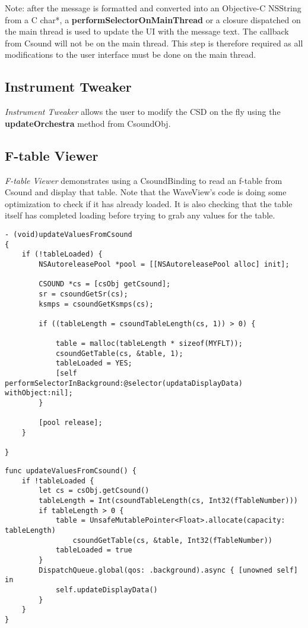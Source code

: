 \documentclass[11pt]{article}
\begin{document}
Note: after the message is formatted and converted into an Objective-C NSString from a C char*, a \textbf{performSelectorOnMainThread} or a closure dispatched on the main thread is used to update the UI with the message text.  The callback from Csound will not be on the main thread. This step is therefore required as all modifications to the user interface must be done on the main thread.

\subsection{Instrument Tweaker}

\emph{Instrument Tweaker} allows the user to modify the CSD on the fly using the \textbf{updateOrchestra} method from CsoundObj. 

\subsection{F-table Viewer}

\emph{F-table Viewer} demonstrates using a CsoundBinding to read an f-table from Csound and display that table.  Note that the WaveView's code is doing some optimization to check if it has already loaded.  It is also checking that the table itself has completed loading before trying to grab any values for the table.

\begin{lstlisting}[caption=Waveview code demonstrating reading f-tables from Csound]
- (void)updateValuesFromCsound
{
    if (!tableLoaded) {
        NSAutoreleasePool *pool = [[NSAutoreleasePool alloc] init];

        CSOUND *cs = [csObj getCsound];
        sr = csoundGetSr(cs);
        ksmps = csoundGetKsmps(cs);

        if ((tableLength = csoundTableLength(cs, 1)) > 0) {

            table = malloc(tableLength * sizeof(MYFLT));
            csoundGetTable(cs, &table, 1);
            tableLoaded = YES;
            [self performSelectorInBackground:@selector(updataDisplayData) withObject:nil];
        }

        [pool release];
    }

}
\end{lstlisting}

\pagebreak
\begin{lstlisting}[caption=Equivalent example in Swift 3]
func updateValuesFromCsound() {
    if !tableLoaded {
        let cs = csObj.getCsound()
        tableLength = Int(csoundTableLength(cs, Int32(fTableNumber)))
        if tableLength > 0 {
            table = UnsafeMutablePointer<Float>.allocate(capacity: tableLength)
                csoundGetTable(cs, &table, Int32(fTableNumber))
            tableLoaded = true
        }
        DispatchQueue.global(qos: .background).async { [unowned self] in
            self.updateDisplayData()
        }
    }
}
\end{lstlisting}
\end{document}
